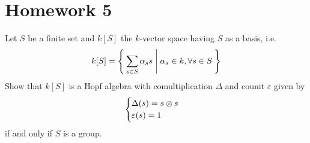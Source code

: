 \section*{Homework 5}

\setcounter{exercise}{0}

\begin{exercise}
Let \(S\) be a finite set and \(k[S]\) the \(k\)-vector space having \(S\) as a basis, i.e.
\[
    k[S] = \Set{ \sum_{s \in S} \alpha_s s | \alpha_s \in k, \forall s \in S }
\]
Show that \(k[S]\) is a Hopf algebra with comultiplication \(\Delta\) and counit \(\varepsilon\) given by
\[
\begin{cases}
    \Delta(s) = s \otimes s \\
    \varepsilon(s) = 1
\end{cases}
\]
if and only if \(S\) is a group.
\end{exercise}
